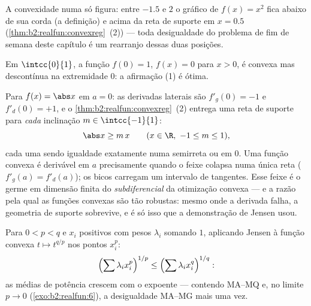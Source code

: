 \begin{omfigure}

{\small A convexidade numa só figura: entre $-1.5$ e $2$ o
gráfico de $f(x) = x^2$ fica abaixo de sua corda (a definição) e
acima da reta de suporte em $x = 0.5$
(\cref{thm:b2:realfun:convexreg}~(2)) --- toda desigualdade do
problema de fim de semana deste capítulo é um rearranjo dessas duas
posições.}
\end{omfigure}

\begin{example}
Em $\intcc{0}{1}$, a função $f(0) = 1$, $f(x) = 0$ para $x > 0$,
é convexa mas descontínua na extremidade $0$: a afirmação (1) é
ótima.
\end{example}

\begin{example}\label{ex:b2:realfun:corner}
Para $f(x) = \abs x$ em $a = 0$: as derivadas laterais são
$f'_g(0) = -1$ e $f'_d(0) = +1$, e o
\cref{thm:b2:realfun:convexreg}~(2) entrega uma reta de suporte para
\emph{cada} inclinação $m \in \intcc{-1}{1}$:
\[
\abs x \geq m\,x \qquad (x \in \R,\ -1 \leq m \leq 1),
\]
cada uma sendo igualdade exatamente numa semirreta ou em $0$. Uma função
convexa é derivável em $a$ precisamente quando o feixe
colapsa numa única reta ($f'_g(a) = f'_d(a)$); os bicos carregam
um intervalo de tangentes. Esse feixe é o germe em dimensão finita
do \emph{subdiferencial} da otimização convexa ---
e a razão pela qual as funções convexas são tão robustas: mesmo onde a
derivada falha, a geometria de suporte sobrevive, e é só isso
que a demonstração de Jensen usou.
\end{example}

\begin{example}\label{ex:b2:realfun:powermeans}
Para $0 < p < q$ e $x_i$ positivos com pesos $\lambda_i$
somando $1$, aplicando Jensen à função convexa $t \mapsto t^{q/p}$
nos pontos $x_i^p$:
\[
\Bigl(\sum \lambda_i x_i^{p}\Bigr)^{1/p}
\leq \Bigl(\sum \lambda_i x_i^{q}\Bigr)^{1/q} :
\]
as médias de potência crescem com o expoente --- contendo MA--MQ e,
no limite $p \to 0$ (\cref{exo:b2:realfun:6}), a desigualdade
MA--MG mais uma vez.
\end{example}

